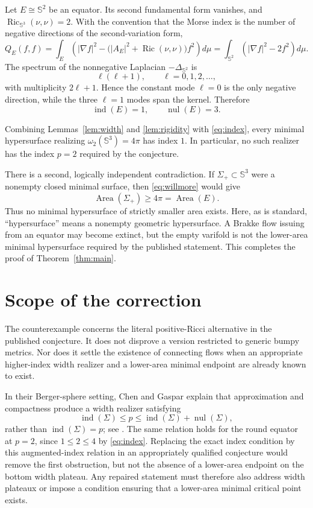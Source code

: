 \documentclass[11pt]{article}
\theoremstyle{remark}
\newcommand{\Sph}{\mathbb S}
\newcommand{\ind}{\operatorname{ind}}
\newcommand{\nul}{\operatorname{nul}}
\newcommand{\Ric}{\operatorname{Ric}}
\newcommand{\Area}{\operatorname{Area}}
\begin{document}
Let $E\cong\Sph^2$ be an equator.  Its second fundamental form vanishes,
and $\Ric_{\Sph^3}(\nu,\nu)=2$.  With the convention that the Morse index
is the number of negative directions of the second-variation form,
\[
  Q_E(f,f)
  =\int_E\left(|\nabla f|^2-
  \bigl(|A_E|^2+\Ric(\nu,\nu)\bigr)f^2\right)d\mu
  =\int_{\Sph^2}\left(|\nabla f|^2-2f^2\right)d\mu.
\]
The spectrum of the nonnegative Laplacian $-\Delta_{\Sph^2}$ is
\[
  \ell(\ell+1),
  \qquad \ell=0,1,2,\ldots,
\]
with multiplicity $2\ell+1$.  Hence the constant mode $\ell=0$ is the
only negative direction, while the three $\ell=1$ modes span the kernel.
Therefore
\begin{equation}\label{eq:index}
  \ind(E)=1,
  \qquad
  \nul(E)=3.
\end{equation}

Combining Lemmas~\ref{lem:width} and \ref{lem:rigidity} with
\eqref{eq:index}, every minimal hypersurface realizing
$\omega_2(\Sph^3)=4\pi$ has index $1$.  In particular, no such realizer
has the index $p=2$ required by the conjecture.

There is a second, logically independent contradiction.  If
$\Sigma_+\subset\Sph^3$ were a nonempty closed minimal surface, then
\eqref{eq:willmore} would give
\[
  \Area(\Sigma_+)\geq4\pi=\Area(E).
\]
Thus no minimal hypersurface of strictly smaller area exists.  Here, as is
standard, ``hypersurface'' means a nonempty geometric hypersurface.  A
Brakke flow issuing from an equator may become extinct, but the empty
varifold is not the lower-area minimal hypersurface required by the
published statement.  This completes the proof of
Theorem~\ref{thm:main}.

\section{Scope of the correction}

The counterexample concerns the literal positive-Ricci alternative in
the published conjecture.  It does not disprove a version restricted to
generic bumpy metrics.  Nor does it settle the existence of connecting
flows when an appropriate higher-index width realizer and a lower-area
minimal endpoint are already known to exist.

In their Berger-sphere setting, Chen and Gaspar explain that approximation
and compactness produce a width realizer satisfying
\[
  \ind(\Sigma)\leq p\leq\ind(\Sigma)+\nul(\Sigma),
\]
rather than $\ind(\Sigma)=p$; see \cite[Remark~1]{ChenGaspar}.  The same
relation holds for the round equator at $p=2$, since $1\leq2\leq4$ by
\eqref{eq:index}.  Replacing the exact index condition by this
augmented-index relation in an appropriately qualified conjecture would
remove the first obstruction, but not the absence of a lower-area endpoint
on the bottom width plateau.  Any repaired statement must therefore also
address width plateaux or impose a condition ensuring that a lower-area
minimal critical point exists.
\end{document}
